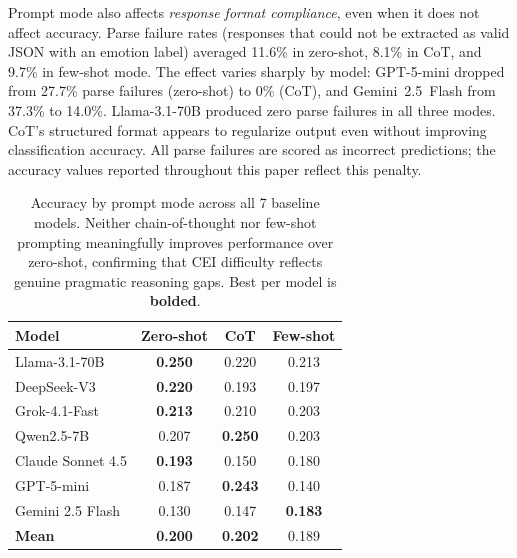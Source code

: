 \documentclass[twoside,11pt]{article}
\begin{document}
Prompt mode also affects \textit{response format compliance}, even when it does not affect accuracy. Parse failure rates (responses that could not be extracted as valid JSON with an emotion label) averaged 11.6\% in zero-shot, 8.1\% in CoT, and 9.7\% in few-shot mode. The effect varies sharply by model: GPT-5-mini dropped from 27.7\% parse failures (zero-shot) to 0\% (CoT), and Gemini~2.5~Flash from 37.3\% to 14.0\%. Llama-3.1-70B produced zero parse failures in all three modes. CoT's structured format appears to regularize output even without improving classification accuracy. All parse failures are scored as incorrect predictions; the accuracy values reported throughout this paper reflect this penalty.

\begin{table}[t]
\centering
\caption{Accuracy by prompt mode across all 7 baseline models. Neither chain-of-thought nor few-shot prompting meaningfully improves performance over zero-shot, confirming that CEI difficulty reflects genuine pragmatic reasoning gaps. Best per model is \textbf{bolded}.}
\label{tab:prompt-modes}
\small
\begin{tabular}{@{}lccc@{}}
\toprule
\textbf{Model} & \textbf{Zero-shot} & \textbf{CoT} & \textbf{Few-shot} \\
\midrule
Llama-3.1-70B & \textbf{0.250} & 0.220 & 0.213 \\
DeepSeek-V3 & \textbf{0.220} & 0.193 & 0.197 \\
Grok-4.1-Fast & \textbf{0.213} & 0.210 & 0.203 \\
Qwen2.5-7B & 0.207 & \textbf{0.250} & 0.203 \\
Claude Sonnet 4.5 & \textbf{0.193} & 0.150 & 0.180 \\
GPT-5-mini & 0.187 & \textbf{0.243} & 0.140 \\
Gemini 2.5 Flash & 0.130 & 0.147 & \textbf{0.183} \\
\midrule
\textbf{Mean} & \textbf{0.200} & \textbf{0.202} & 0.189 \\
\bottomrule
\end{tabular}
\end{table}
\end{document}
